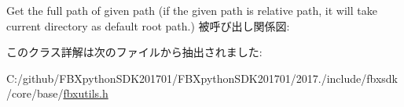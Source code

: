 Get the full path of given path (if the given path is relative path, it will take current directory as default root path.) 被呼び出し関係図\+:


このクラス詳解は次のファイルから抽出されました\+:\begin{DoxyCompactItemize}
\item 
C\+:/github/\+F\+B\+Xpython\+S\+D\+K201701/\+F\+B\+Xpython\+S\+D\+K201701/2017./include/fbxsdk/core/base/\hyperlink{fbxutils_8h}{fbxutils.\+h}\end{DoxyCompactItemize}

